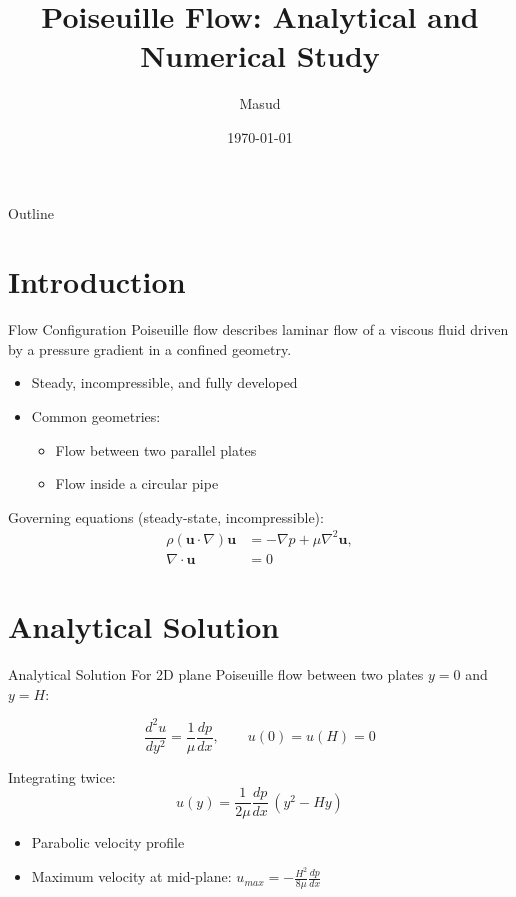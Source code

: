 \documentclass{beamer}
\title{Poiseuille Flow: Analytical and Numerical Study}
\author{Masud}
\date{\today}
\begin{document}
\begin{frame}
\titlepage
\end{frame}

\begin{frame}{Outline}
\tableofcontents
\end{frame}

\section{Introduction}
\begin{frame}{Flow Configuration}
Poiseuille flow describes laminar flow of a viscous fluid driven by a pressure gradient in a confined geometry.

\begin{itemize}
    \item Steady, incompressible, and fully developed
    \item Common geometries:
    \begin{itemize}
        \item Flow between two parallel plates
        \item Flow inside a circular pipe
    \end{itemize}
\end{itemize}

Governing equations (steady-state, incompressible):
\[
\begin{aligned}
\rho (\mathbf{u} \cdot \nabla)\mathbf{u} &= -\nabla p + \mu \nabla^2 \mathbf{u}, \\
\nabla \cdot \mathbf{u} &= 0
\end{aligned}
\]
\end{frame}

\section{Analytical Solution}
\begin{frame}{Analytical Solution}
For 2D plane Poiseuille flow between two plates $y = 0$ and $y = H$:

\[
\frac{d^2 u}{dy^2} = \frac{1}{\mu} \frac{dp}{dx}, \qquad u(0) = u(H) = 0
\]

Integrating twice:
\[
u(y) = \frac{1}{2\mu} \frac{dp}{dx} \, (y^2 - Hy)
\]

\begin{itemize}
    \item Parabolic velocity profile
    \item Maximum velocity at mid-plane: \( u_{max} = -\frac{H^2}{8\mu} \frac{dp}{dx} \)
\end{itemize}
\end{frame}
\end{document}

